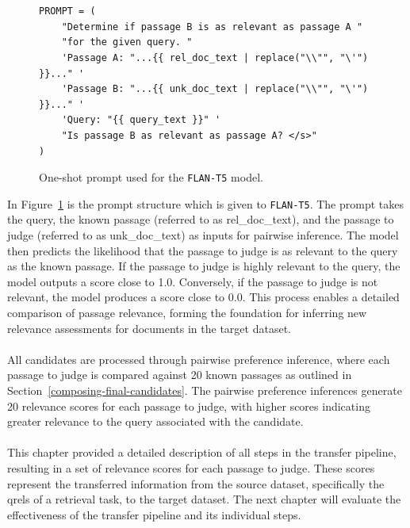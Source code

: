 \\\\
\begin{figure}[ht]
    \centering
    \begin{tcolorbox}[title=One-Shot Prompt, width=0.95\textwidth]
        \footnotesize
        \begin{verbatim}
PROMPT = (
    "Determine if passage B is as relevant as passage A "
    "for the given query. "
    'Passage A: "...{{ rel_doc_text | replace("\\"", "\'") }}..." '
    'Passage B: "...{{ unk_doc_text | replace("\\"", "\'") }}..." '
    'Query: "{{ query_text }}" '
    "Is passage B as relevant as passage A? </s>"
)
        \end{verbatim}
    \end{tcolorbox}
    \caption{One-shot prompt used for the \texttt{FLAN-T5} model.}
    \label{fig:oneshot-prompt}
\end{figure}

In Figure~\ref{fig:oneshot-prompt} is the prompt structure which is given to \texttt{FLAN-T5}. The prompt takes the query, the known passage (referred to as rel\_doc\_text), and the passage to judge (referred to as unk\_doc\_text) as inputs for pairwise inference. The model then predicts the likelihood that the passage to judge is as relevant to the query as the known passage. If the passage to judge is highly relevant to the query, the model outputs a score close to 1.0. Conversely, if the passage to judge is not relevant, the model produces a score close to 0.0. This process enables a detailed comparison of passage relevance, forming the foundation for inferring new relevance assessments for documents in the target dataset.
\\\\
All candidates are processed through pairwise preference inference, where each passage to judge is compared against 20 known passages as outlined in Section~\ref{composing-final-candidates}. The pairwise preference inferences generate 20 relevance scores for each passage to judge, with higher scores indicating greater relevance to the query associated with the candidate.
\\\\
This chapter provided a detailed description of all steps in the transfer pipeline, resulting in a set of relevance scores for each passage to judge. These scores represent the transferred information from the source dataset, specifically the qrels of a retrieval task, to the target dataset. The next chapter will evaluate the effectiveness of the transfer pipeline and its individual steps.